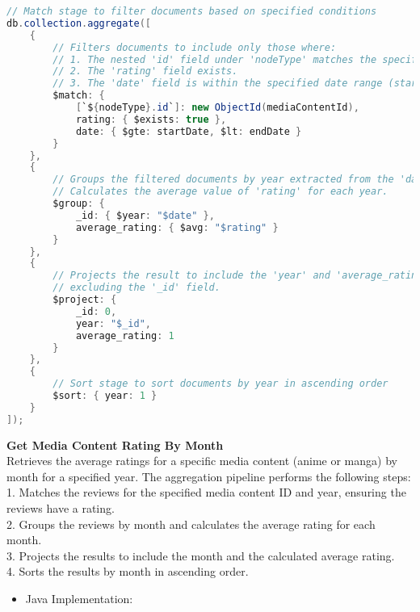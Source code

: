 \begin{mdframed}[style=customstyle]
\begin{lstlisting}[language=java]
// Match stage to filter documents based on specified conditions
db.collection.aggregate([
    {
        // Filters documents to include only those where:
        // 1. The nested 'id' field under 'nodeType' matches the specified 'mediaContentId'.
        // 2. The 'rating' field exists.
        // 3. The 'date' field is within the specified date range (startDate to endDate).
        $match: {
            [`${nodeType}.id`]: new ObjectId(mediaContentId),
            rating: { $exists: true },
            date: { $gte: startDate, $lt: endDate }
        }
    },
    {
        // Groups the filtered documents by year extracted from the 'date' field.
        // Calculates the average value of 'rating' for each year.
        $group: {
            _id: { $year: "$date" },
            average_rating: { $avg: "$rating" }
        }
    },
    {
        // Projects the result to include the 'year' and 'average_rating' fields,
        // excluding the '_id' field.
        $project: {
            _id: 0,
            year: "$_id",
            average_rating: 1
        }
    },
    {
        // Sort stage to sort documents by year in ascending order
        $sort: { year: 1 }
    }
]);\end{lstlisting}
\end{mdframed}

\textbf{Get Media Content Rating By Month}\\
Retrieves the average ratings for a specific media content (anime or manga) by month for a specified year.
The aggregation pipeline performs the following steps:\\
1. Matches the reviews for the specified media content ID and year, ensuring the reviews have a rating.\\
2. Groups the reviews by month and calculates the average rating for each month.\\
3. Projects the results to include the month and the calculated average rating.\\
4. Sorts the results by month in ascending order.
\begin{itemize}
    \item Java Implementation:
\end{itemize}

